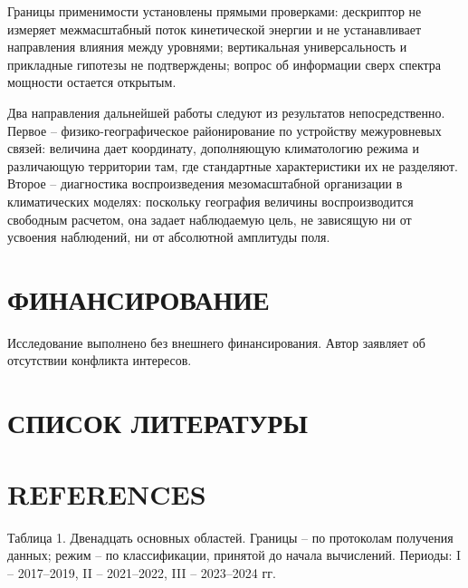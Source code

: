 \documentclass[12pt,a4paper]{article}
\begin{document}
Границы применимости установлены прямыми проверками: дескриптор не измеряет межмасштабный поток кинетической энергии и не устанавливает направления влияния между уровнями; вертикальная универсальность и прикладные гипотезы не подтверждены; вопрос об информации сверх спектра мощности остается открытым.

Два направления дальнейшей работы следуют из результатов непосредственно. Первое -- физико-географическое районирование по устройству межуровневых связей: величина дает координату, дополняющую климатологию режима и различающую территории там, где стандартные характеристики их не разделяют. Второе -- диагностика воспроизведения мезомасштабной организации в климатических моделях: поскольку география величины воспроизводится свободным расчетом, она задает наблюдаемую цель, не зависящую ни от усвоения наблюдений, ни от абсолютной амплитуды поля.

\section{ФИНАНСИРОВАНИЕ}

Исследование выполнено без внешнего финансирования. Автор заявляет об отсутствии конфликта интересов.

\clearpage
\section{СПИСОК ЛИТЕРАТУРЫ}


\clearpage
\section{REFERENCES}


\clearpage
\noindent Таблица 1. Двенадцать основных областей. Границы -- по протоколам получения данных; режим -- по классификации, принятой до начала вычислений. Периоды: I -- 2017--2019, II -- 2021--2022, III -- 2023--2024 гг.
\end{document}
